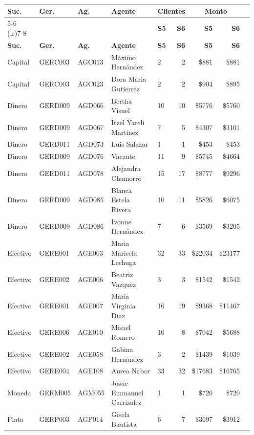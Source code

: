 \documentclass[11pt,a4paper]{article}
\newcommand{\money}[1]{\$\num{#1}}
\begin{document}
\begin{center}
\renewcommand{\arraystretch}{1.3}
\footnotesize
\begin{longtable}{lllllrrrr}
\toprule
\textbf{Suc.} & \textbf{Ger.} & \textbf{Ag.} & \textbf{Agente}
  & \multicolumn{2}{c}{\textbf{Clientes}} & \multicolumn{2}{c}{\textbf{Monto}} \\
\cmidrule(lr){5-6} \cmidrule(lr){7-8}
& & & & \textbf{S5} & \textbf{S6} & \textbf{S5} & \textbf{S6} \\
\midrule
\endfirsthead
\toprule
\textbf{Suc.} & \textbf{Ger.} & \textbf{Ag.} & \textbf{Agente}
  & \textbf{S5} & \textbf{S6} & \textbf{S5} & \textbf{S6} \\
\midrule
\endhead
Capital & GERC003 & AGC013 & Máximo Hernández & 2 & 2 & \money{881} & \money{881} \\
Capital & GERC003 & AGC023 & Dora Maria Gutierrez & 2 & 2 & \money{904} & \money{895} \\
Dinero & GERD009 & AGD066 & Bertha Visuel & 10 & 10 & \money{5776} & \money{5760} \\
Dinero & GERD009 & AGD067 & Itzel Yareli Martinez & 7 & 5 & \money{4307} & \money{3101} \\
Dinero & GERD011 & AGD073 & Luis Salazar & 1 & 1 & \money{453} & \money{453} \\
Dinero & GERD009 & AGD076 & Vacante & 11 & 9 & \money{5745} & \money{4664} \\
Dinero & GERD011 & AGD078 & Alejandra Chamorro & 15 & 17 & \money{8777} & \money{9296} \\
Dinero & GERD009 & AGD085 & Blanca Estela Rivera & 10 & 11 & \money{5826} & \money{6075} \\
Dinero & GERD009 & AGD086 & Ivonne Hernández & 7 & 6 & \money{3569} & \money{3205} \\
Efectivo & GERE001 & AGE003 & Maria Maricela Lechuga & 32 & 33 & \money{22034} & \money{23177} \\
Efectivo & GERE002 & AGE006 & Beatriz Vazquez & 3 & 3 & \money{1542} & \money{1542} \\
Efectivo & GERE001 & AGE007 & Maria Virginia Diaz & 16 & 19 & \money{9368} & \money{11467} \\
Efectivo & GERE006 & AGE010 & Misael Romero & 10 & 8 & \money{7042} & \money{5688} \\
Efectivo & GERE002 & AGE058 & Gabina Hernandez & 3 & 2 & \money{1439} & \money{1039} \\
Efectivo & GERE004 & AGE108 & Aurea Nabor & 33 & 32 & \money{17683} & \money{16765} \\
Moneda & GERM005 & AGM055 & Josue Emmanuel Carrizalez & 1 & 1 & \money{720} & \money{720} \\
Plata & GERP003 & AGP014 & Gisela Bautista & 6 & 7 & \money{3697} & \money{3912} \\

\bottomrule
\end{longtable}
\end{center}
\end{document}
